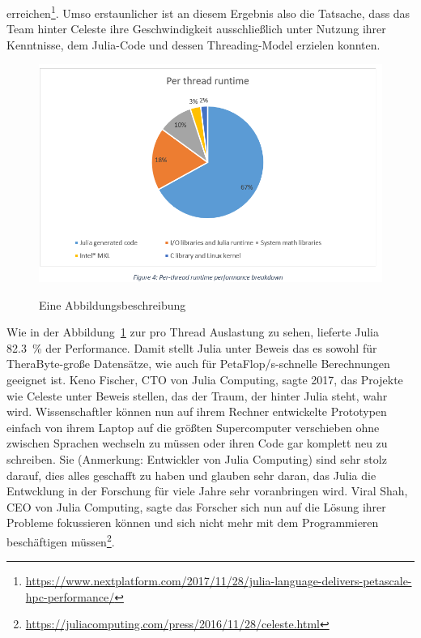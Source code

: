 \documentclass[proseminar,german,utf8]{zihpub}
\begin{document}
erreichen\footnote{\url{https://www.nextplatform.com/2017/11/28/julia-language-delivers-petascale-hpc-performance/}}. Umso erstaunlicher ist an diesem Ergebnis also die Tatsache, dass das Team hinter Celeste ihre Geschwindigkeit ausschließlich unter Nutzung ihrer Kenntnisse, dem Julia-Code und dessen Threading-Model erzielen konnten.

\begin{figure}[hbt!]
  \centering
  \caption{Eine Abbildungsbeschreibung}
  \includegraphics[scale=0.5]{celestejulia.png}
  \label{fig:celestejulia}
\end{figure}

Wie in der Abbildung~\ref{fig:celestejulia} zur pro Thread Auslastung zu sehen, lieferte Julia 82.3~\% der Performance. Damit stellt Julia unter Beweis das es sowohl für TheraByte-große Datensätze, wie auch für PetaFlop/s-schnelle Berechnungen geeignet ist. Keno Fischer, CTO von Julia Computing, sagte 2017, das Projekte wie Celeste unter Beweis stellen, das der Traum, der hinter Julia steht, wahr wird. Wissenschaftler können nun auf ihrem Rechner entwickelte Prototypen einfach von ihrem Laptop auf die größten Supercomputer verschieben ohne zwischen Sprachen wechseln zu müssen oder ihren Code gar komplett neu zu schreiben. Sie (Anmerkung: Entwickler von Julia Computing) sind sehr stolz darauf, dies alles geschafft zu haben und glauben sehr daran, das Julia die Entwcklung in der Forschung für viele Jahre sehr voranbringen wird. Viral Shah, CEO von Julia Computing, sagte das Forscher sich nun auf die Lösung ihrer Probleme fokussieren können und sich nicht mehr mit dem Programmieren beschäftigen müssen\footnote{\url{https://juliacomputing.com/press/2016/11/28/celeste.html}}.
\end{document}
